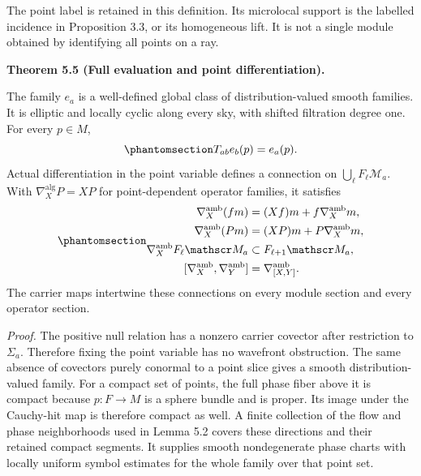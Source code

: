 \documentclass[
  english,
  11pt,
  reqno]{amsart}
\makeatletter
\newcommand{\pandocstatementheading}[1]{%
  \par\if@nobreak\else
    \addpenalty{\@beginparpenalty}%
    \addvspace{.5\baselineskip plus .2\baselineskip minus .2\baselineskip}%
  \fi
  {\normalfont\bfseries #1\par}%
  \nobreak\@afterindenttrue\@afterheading
}
\makeatother
\begin{document}
The point label is retained in this definition. Its microlocal support
is the labelled incidence in Proposition 3.3, or its homogeneous lift.
It is not a single module obtained by identifying all points on a ray.

\pandocstatementheading{\protect{}\label{thm:global-evaluation-and-point-connection}Theorem 5.5 (Full evaluation and point differentiation).}

The family \(e_a\) is a well-defined global class of distribution-valued
smooth families. It is elliptic and locally cyclic along every sky, with
shifted filtration degree one. For every \(p\in M\),
\begin{equation}\protect\phantomsection\label{eq:global-evaluation-covariance}{
T_{ab}e_b(p)=e_a(p).
}\end{equation} Actual differentiation in the point variable defines a
connection on \(\bigcup_\ell F_\ell\mathscr M_a\). With
\(\nabla_X^{\mathrm{alg}}P=XP\) for point-dependent operator families,
it satisfies
\begin{equation}\protect\phantomsection\label{eq:global-point-connection}{
\begin{aligned}
\nabla_X^{\mathrm{amb}}(fm)&=(Xf)m+f\nabla_X^{\mathrm{amb}}m,\\
\nabla_X^{\mathrm{amb}}(Pm)&=(XP)m+P\nabla_X^{\mathrm{amb}}m,\\
\nabla_X^{\mathrm{amb}}F_\ell\mathscr M_a&\subset F_{\ell+1}\mathscr M_a,\\
[\nabla_X^{\mathrm{amb}},\nabla_Y^{\mathrm{amb}}]
&=\nabla_{[X,Y]}^{\mathrm{amb}}.
\end{aligned}
}\end{equation} The carrier maps intertwine these connections on every
module section and every operator section.

\emph{Proof.} The positive null relation has a nonzero carrier covector
after restriction to \(\Sigma_a\). Therefore fixing the point variable
has no wavefront obstruction. The same absence of covectors purely
conormal to a point slice gives a smooth distribution-valued family. For
a compact set of points, the full phase fiber above it is compact
because \(p:F\to M\) is a sphere bundle and is proper. Its image under
the Cauchy-hit map is therefore compact as well. A finite collection of
the flow and phase neighborhoods used in Lemma 5.2 covers these
directions and their retained compact segments. It supplies smooth
nondegenerate phase charts with locally uniform symbol estimates for the
whole family over that point set.
\end{document}
